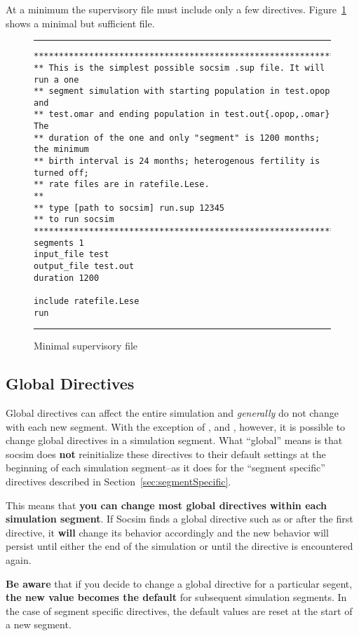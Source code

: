 At a minimum the supervisory file must include only a few directives.
Figure~\ref{fig:supSample} shows a minimal but sufficient 
file. 
\begin{figure}[h]
  \centering
\vspace{.25cm}
\rule{.5\textwidth}{.1mm}
\begin{verbatim}
************************************************************************
** This is the simplest possible socsim .sup file. It will run a one
** segment simulation with starting population in test.opop and
** test.omar and ending population in test.out{.opop,.omar} The
** duration of the one and only "segment" is 1200 months; the minimum
** birth interval is 24 months; heterogenous fertility is turned off;
** rate files are in ratefile.Lese.
**
** type [path to socsim] run.sup 12345
** to run socsim
************************************************************************
segments 1
input_file test
output_file test.out
duration 1200

include ratefile.Lese
run

\end{verbatim}
  \caption{Minimal supervisory file}
  \label{fig:supSample}
\rule{.5\textwidth}{.1mm}
\end{figure}
\clearpage
\subsection{Global Directives}
\label{sec:globalDirectives}

Global directives can affect the entire simulation and
\emph{generally} do not change with each new segment. With the
exception of ,  and
, however, it is possible to change global
directives in a simulation segment. What ``global'' means is that
socsim does \textbf{not} reinitialize these directives to their
default settings at the beginning of each simulation segment--as it
does for the ``segment specific'' directives described in
Section~\ref{sec:segmentSpecific}.

This means that \textbf{you can change most global directives within
  each simulation segment}.  If Socsim finds a global directive such
as  or  after the first 
directive, it \textbf{will} change its behavior accordingly and the
new behavior will persist until either the end of the simulation or
until the directive is encountered again.

\textbf{Be aware} that if you decide to change a global directive for
a particular segent, \textbf{the new value becomes the default} for
subsequent simulation segments.  In the case of segment specific
directives, the default values are reset at the start of a new
segment.

